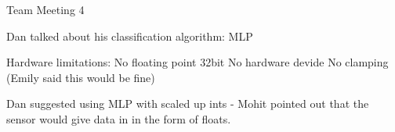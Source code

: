 \documentclass{article}
\begin{document}

\begin{Minutes}{Team Meeting 4}
\starttime{13:00}
\endtime{15:00}
\maketitle

Dan talked about his classification algorithm:
MLP

Hardware limitations:
	No floating point
	32bit
	No hardware devide
	No clamping (Emily said this would be fine)

Dan suggested using MLP with scaled up ints - Mohit pointed out that the sensor would give data in
in the form of floats.

\end{Minutes}
\end{document}
